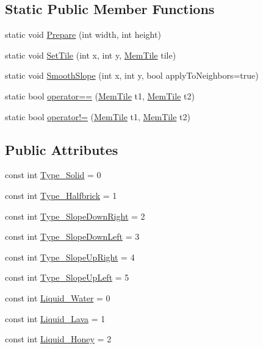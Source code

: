 \subsection*{Static Public Member Functions}
\begin{DoxyCompactItemize}
\item 
static void \hyperlink{class_o_t_a_1_1_memory_1_1_mem_tile_a81fc5a4934cf0de7fde70f48faa57694}{Prepare} (int width, int height)
\item 
static void \hyperlink{class_o_t_a_1_1_memory_1_1_mem_tile_a4314bf661a11c4e518b122e6abe234bc}{Set\+Tile} (int x, int y, \hyperlink{class_o_t_a_1_1_memory_1_1_mem_tile}{Mem\+Tile} tile)
\item 
static void \hyperlink{class_o_t_a_1_1_memory_1_1_mem_tile_a8f3d892cb30a910e221ca3fa71357069}{Smooth\+Slope} (int x, int y, bool apply\+To\+Neighbors=true)
\item 
static bool \hyperlink{class_o_t_a_1_1_memory_1_1_mem_tile_adfd9eedfe42efbc97154544e1aba34da}{operator==} (\hyperlink{class_o_t_a_1_1_memory_1_1_mem_tile}{Mem\+Tile} t1, \hyperlink{class_o_t_a_1_1_memory_1_1_mem_tile}{Mem\+Tile} t2)
\item 
static bool \hyperlink{class_o_t_a_1_1_memory_1_1_mem_tile_a12b14ea83a16d9426ad331cc0e495897}{operator!=} (\hyperlink{class_o_t_a_1_1_memory_1_1_mem_tile}{Mem\+Tile} t1, \hyperlink{class_o_t_a_1_1_memory_1_1_mem_tile}{Mem\+Tile} t2)
\end{DoxyCompactItemize}
\subsection*{Public Attributes}
\begin{DoxyCompactItemize}
\item 
const int \hyperlink{class_o_t_a_1_1_memory_1_1_mem_tile_ae988cf404371e98a5b5bb5b2e37e7696}{Type\+\_\+\+Solid} = 0
\item 
const int \hyperlink{class_o_t_a_1_1_memory_1_1_mem_tile_a9c28242670de02f38e91fe103497e98c}{Type\+\_\+\+Halfbrick} = 1
\item 
const int \hyperlink{class_o_t_a_1_1_memory_1_1_mem_tile_a82a9d4f7fee99bc1ea1dfda32b2052b6}{Type\+\_\+\+Slope\+Down\+Right} = 2
\item 
const int \hyperlink{class_o_t_a_1_1_memory_1_1_mem_tile_ad7a93003f3a96be0ca58447cdfc731e8}{Type\+\_\+\+Slope\+Down\+Left} = 3
\item 
const int \hyperlink{class_o_t_a_1_1_memory_1_1_mem_tile_a3555a64eca1eb5e4a274ab13bff1ded4}{Type\+\_\+\+Slope\+Up\+Right} = 4
\item 
const int \hyperlink{class_o_t_a_1_1_memory_1_1_mem_tile_ab7939f53a56a80e46788806b68403b1a}{Type\+\_\+\+Slope\+Up\+Left} = 5
\item 
const int \hyperlink{class_o_t_a_1_1_memory_1_1_mem_tile_a59045f03d4c444190ed2b016d259192c}{Liquid\+\_\+\+Water} = 0
\item 
const int \hyperlink{class_o_t_a_1_1_memory_1_1_mem_tile_a214563bf3cd16bc0ba57f39450cb9302}{Liquid\+\_\+\+Lava} = 1
\item 
const int \hyperlink{class_o_t_a_1_1_memory_1_1_mem_tile_abfda57b0df2848dd50736d19e5e245d5}{Liquid\+\_\+\+Honey} = 2
\end{DoxyCompactItemize}
